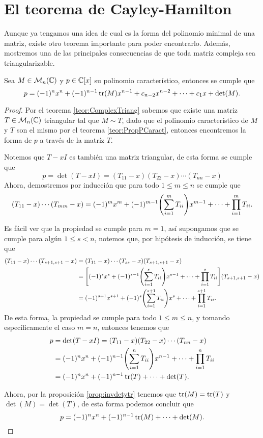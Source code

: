 \section{El teorema de Cayley-Hamilton}

Aunque ya tengamos una idea de cual es la forma del polinomio minimal de una matriz, existe otro teorema importante para poder encontrarlo. Además, mostremos una de las principales consecuencias de que toda matriz compleja sea triangularizable.

\begin{teor}\label{teor:CaracPolyForm}
  Sea $M \in \mathcal{M}_n(\mathbb{C})$ y $p \in \mathbb{C}[x]$ su polinomio característico, entonces se cumple que
    \[ p = (-1)^n x^n + (-1)^{n-1} \operatorname{tr}(M) x^{n-1} + c_{n-2}x^{n-2} + \cdots + c_1 x + \det(M). \]
\end{teor}

\begin{proof}
  Por el teorema \ref{teor:ComplexTriang} sabemos que existe una matriz $T \in \mathcal{M}_n(\mathbb{C})$ triangular tal que $M \sim T$, dado que el polinomio característico de $M$ y $T$ son el mismo por el teorema \ref{teor:PropPCaract}, entonces encontremos la forma de $p$ a través de la matríz $T$.

  Notemos que $T-xI$ es también una matriz triangular, de esta forma se cumple que
  \[
    p = \det(T-xI) = (T_{11}-x)(T_{22}-x)\cdots(T_{nn}-x)
  \]
  Ahora, demostremos por inducción que para todo $1 \leq m \leq n$ se cumple que
    \[ (T_{11}-x)\cdots(T_{mm}-x) = (-1)^m x^m + (-1)^{m-1}\paren{\sum_{i=1}^m T_{ii}}x^{m-1} + \cdots + \prod_{i=1}^m T_{ii}. \]

  Es fácil ver que la propiedad se cumple para $m=1$, así supongamos que se cumple para algún $1 \leq s < n$, notemos que, por hipótesis de inducción, se tiene que
  \begin{align*}
    (T_{11}-x)\cdots(T_{s+1,s+1}-x) &= (T_{11}-x)\cdots(T_{ss}-x)(T_{s+1,s+1}-x) \\
      &= \corch{(-1)^s x^s + (-1)^{s-1}\paren{\sum_{i=1}^s T_{ii}}x^{s-1} + \cdots + \prod_{i=1}^s T_{ii}} (T_{s+1,s+1}-x) \\
      &= (-1)^{s+1} x^{s+1} + (-1)^{s}\paren{\sum_{i=1}^{s+1} T_{ii}}x^{s} + \cdots + \prod_{i=1}^{s+1}T_{ii}.
  \end{align*}
  De esta forma, la propiedad se cumple para todo $1\leq m \leq n$, y tomando específicamente el caso $m=n$, entonces tenemos que 
  \begin{align*}
    p &= \det(T-xI) = (T_{11}-x)(T_{22}-x)\cdots(T_{nn}-x)   \\
      &= (-1)^n x^n + (-1)^{n-1}\paren{\sum_{i=1}^n T_{ii}}x^{n-1} + \cdots + \prod_{i=1}^n T_{ii} \\
      &= (-1)^n x^n + (-1)^{n-1} \tr(T)  + \cdots + \det(T).
  \end{align*}

  Ahora, por la proposición \ref{prop:invdetytr} tenemos que $\operatorname{tr}(M) = \operatorname{tr}(T)$ y $\det(M) = \det(T)$, de esta forma podemos concluir que
  \[
    p = (-1)^n x^n + (-1)^{n-1} \operatorname{tr}(M)  + \cdots + \det(M). \qedhere
  \]
\end{proof}


